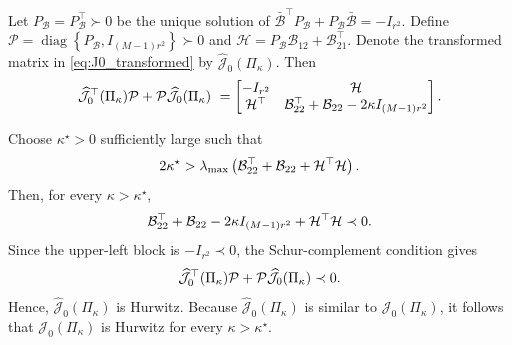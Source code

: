 \documentclass[conference]{IEEEtran}
\begin{document}
\begin{IEEEproof}
		Let
		$
		P_{\mathcal B}
		=
		P_{\mathcal B}^\top
		\succ0
		$
		be the unique solution of
		$
		\bar{\mathcal B}^\top P_{\mathcal B}
		+
		P_{\mathcal B}\bar{\mathcal B}
		=
		-I_{r^2}.
		$
		Define
		$
		\mathcal P
		=
		\operatorname{diag}
		\left\{
		P_{\mathcal B},
		I_{(M-1)r^2}
		\right\}
		\succ0
		$
		and
		$
		\mathcal H
		=
		P_{\mathcal B}\mathcal B_{12}
		+
		\mathcal B_{21}^\top.
		$
		Denote the transformed matrix in
		\eqref{eq:J0_transformed} by $\widehat{\mathcal J}_0(\Pi_\kappa)$.
		Then
		\vspace{-0.2\baselineskip}
		\[
		\begin{aligned}
			\widehat{\mathcal J}_0^\top(\Pi_\kappa)
			\mathcal P
			+
			\mathcal P
			\widehat{\mathcal J}_0(\Pi_\kappa)
			\
			=
			\begin{bmatrix}
				-I_{r^2}
				&
				\mathcal H
				\\
				\mathcal H^\top
				&
				\mathcal B_{22}^\top
				+
				\mathcal B_{22}
				-
				2\kappa I_{(M-1)r^2}
			\end{bmatrix}.
		\end{aligned}		
		\vspace{-0.2\baselineskip}
		\]
		
		Choose $\kappa^\star>0$ sufficiently large such that
		\vspace{-0.2\baselineskip}
		\[
		2\kappa^\star
		>
		\lambda_{\max}
		\left(
		\mathcal B_{22}^\top
		+
		\mathcal B_{22}
		+
		\mathcal H^\top\mathcal H
		\right).		
		\vspace{-0.2\baselineskip}
		\]
		Then, for every $\kappa>\kappa^\star$,
		\vspace{-0.2\baselineskip}
		\[
		\mathcal B_{22}^\top
		+
		\mathcal B_{22}
		-
		2\kappa I_{(M-1)r^2}
		+
		\mathcal H^\top\mathcal H
		\prec0.	
		\vspace{-0.2\baselineskip}	
		\]
		Since the upper-left block is $-I_{r^2}\prec0$, the
		Schur-complement condition gives
		\vspace{-0.2\baselineskip}
		\[
		\widehat{\mathcal J}_0^\top(\Pi_\kappa)
		\mathcal P
		+
		\mathcal P
		\widehat{\mathcal J}_0(\Pi_\kappa)
		\prec0.		
		\vspace{-0.2\baselineskip}
		\]
		Hence, $\widehat{\mathcal J}_0(\Pi_\kappa)$ is Hurwitz.
		Because $\widehat{\mathcal J}_0(\Pi_\kappa)$ is similar to
		$\mathcal J_0(\Pi_\kappa)$, it follows that
		$
		\mathcal J_0(\Pi_\kappa)
		$
		is Hurwitz for every $\kappa>\kappa^\star$.
	\end{IEEEproof}
	
\end{document}

